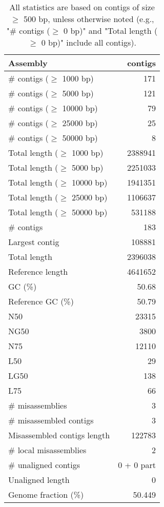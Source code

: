 \documentclass[12pt,a4paper]{article}
\begin{document}
\begin{table}[ht]
\begin{center}
\caption{All statistics are based on contigs of size $\geq$ 500 bp, unless otherwise noted (e.g., "\# contigs ($\geq$ 0 bp)" and "Total length ($\geq$ 0 bp)" include all contigs).}
\begin{tabular}{|l*{1}{|r}|}
\hline
Assembly & contigs \\ \hline
\# contigs ($\geq$ 1000 bp) & 171 \\ \hline
\# contigs ($\geq$ 5000 bp) & 121 \\ \hline
\# contigs ($\geq$ 10000 bp) & 79 \\ \hline
\# contigs ($\geq$ 25000 bp) & 25 \\ \hline
\# contigs ($\geq$ 50000 bp) & 8 \\ \hline
Total length ($\geq$ 1000 bp) & 2388941 \\ \hline
Total length ($\geq$ 5000 bp) & 2251033 \\ \hline
Total length ($\geq$ 10000 bp) & 1941351 \\ \hline
Total length ($\geq$ 25000 bp) & 1106637 \\ \hline
Total length ($\geq$ 50000 bp) & 531188 \\ \hline
\# contigs & 183 \\ \hline
Largest contig & 108881 \\ \hline
Total length & 2396038 \\ \hline
Reference length & 4641652 \\ \hline
GC (\%) & 50.68 \\ \hline
Reference GC (\%) & 50.79 \\ \hline
N50 & 23315 \\ \hline
NG50 & 3800 \\ \hline
N75 & 12110 \\ \hline
L50 & 29 \\ \hline
LG50 & 138 \\ \hline
L75 & 66 \\ \hline
\# misassemblies & 3 \\ \hline
\# misassembled contigs & 3 \\ \hline
Misassembled contigs length & 122783 \\ \hline
\# local misassemblies & 2 \\ \hline
\# unaligned contigs & 0 + 0 part \\ \hline
Unaligned length & 0 \\ \hline
Genome fraction (\%) & 50.449 \\ \hline

\end{tabular}
\end{center}
\end{table}
\end{document}
